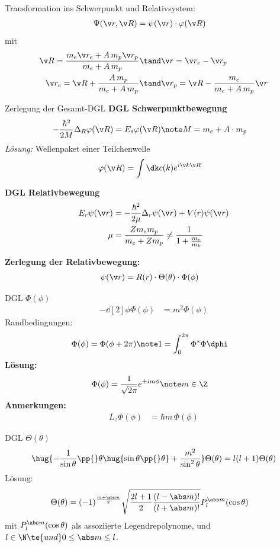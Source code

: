\documentclass[twocolumn]{summery_4.1}
\begin{document}
Transformation ins Schwerpunkt und Relativsystem:
\begin{align*}
    \Psi(\v r, \v R) &= \psi(\v r)\cdot \varphi(\v R)
\end{align*}
mit 
\begin{align*}
    \v R = \frac{m_e \v r_e + A\, m_p \v r_p}{m_e + A \, m_p}&\tand \v r= \v r_e - \v r_p\\
    \v r_e = \v R + \frac{A\, m_p}{m_e + A\, m_p} &\tand \v r_p = \v R - \frac{m_e}{m_e + A\, m_p} \v r
\end{align*}

{\large Zerlegung der Gesamt-DGL}
{\bf DGL Schwerpunktbewegung}
\begin{align*}
    -\frac{\hbar^2}{2M} \Delta_R \varphi(\v R) &= E_s \varphi(\v R)\note M = m_e +A\cdot m_p
\end{align*}
\textit{Lösung:} Wellenpaket einer Teilchenwelle
\begin{align*}
    \varphi(\v R) &= \int\dk c(k) e^{i\v k \v R}
\end{align*}

{\bf DGL Relativbewegung}
\begin{align*}
    E_r \psi(\v r) &= -\frac{\hbar^2}{2\mu} \Delta_r \psi(\v r) + V(r) \psi(\v r) \\
    \mu &= \frac{Z m_e m_p}{m_e + Z m_p}\neq \frac1{1+\frac{m_e}{m_k}}
\end{align*}

\textbf{Zerlegung der Relativbewegung:}
\begin{align*}
    \psi(\v r) &= R(r) \cdot \Theta(\theta) \cdot \Phi(\phi)
\end{align*}

{\large DGL $\Phi(\phi)$}
\begin{align*}
    - \dd[2]{}\phi \Phi(\phi) &= m^2 \Phi(\phi)
\end{align*}
Randbedingungen:
\begin{align*}
    \Phi(\phi) &= \Phi(\phi+2\pi)\note 1 = \int_0^{2\pi} \Phi^* \Phi \dphi
\end{align*}
\textbf{Lösung:}
\begin{align*}
    \Phi(\phi) &= \frac{1}{\sqrt{2\pi}} e^{\pm i m \phi}\note m\in \Z 
\end{align*}
\textbf{Anmerkungen:}
\begin{align*}
    L_z \Phi(\phi) &= \hbar m\, \Phi(\phi)
\end{align*}

{\large DGL $\Theta(\theta)$}
\begin{align*}
    \hug{-\frac{1}{\sin\theta}\pp{}\theta \hug{\sin\theta\pp{}\theta}  + \frac{m^2}{\sin^2\theta}}\Theta(\theta) =  l(l+1)\Theta(\theta)
\end{align*}
Lösung:
\begin{align*}
    \Theta(\theta) &= (-1)^{\frac{m+\abs m}{2}} \sqrt{\frac{2l +1}{2} \frac{(l - \abs m)!}{(l+\abs m)!}} P_l^{\abs m}(\cos\theta) 
\end{align*}
mit \( P_l^{\abs m}(\cos\theta)\) als assoziierte Legendrepolynome, und \( l\in \N\te{ und } 0 \le \abs m \le l\).\\
\end{document}
